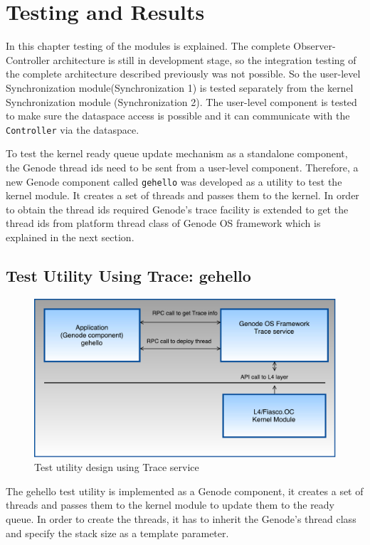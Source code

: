 \chapter{Testing and Results}\label{chap:testing}
In this chapter testing of the modules is explained. The complete Observer-Controller architecture is still in development stage, so the integration testing of the complete architecture described previously was not possible. So the user-level Synchronization module(Synchronization 1) is tested separately from the kernel Synchronization module (Synchronization 2). The user-level component is tested to make sure the dataspace  access is possible and it can communicate with the \texttt{Controller} via the dataspace.

To test the kernel ready queue update mechanism as a standalone component, the Genode thread ids need to be sent from a user-level component. Therefore, a new Genode component called \texttt{gehello} was developed as a utility to test the kernel module. It creates a set of threads and passes them to the kernel. In order to obtain the thread ids required Genode's trace facility is extended to get the thread ids from platform thread class of Genode OS framework which is explained in the next section.

\section{Test Utility Using Trace: gehello}

\begin{figure}[h]
\centering
\includegraphics[width=0.7\linewidth]{figures/test1}
\caption{Test utility design using Trace service}
\label{fig:test}
\end{figure}

The gehello test utility is implemented as a Genode component, it creates a set of threads and passes them to the kernel module to update them to the ready queue. In order to create the threads, it has to inherit the Genode's thread class and specify the stack size as a template parameter. 

